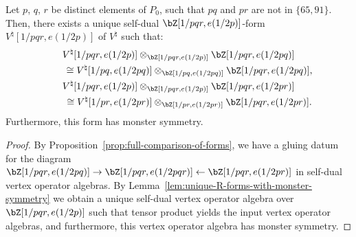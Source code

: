 \begin{lem} \label{lem:descent-for-three-primes}Let $p$, $q$, $r$ be distinct elements of $P_0$, such that $pq$ and $pr$ are not in $\{65, 91 \}$. Then, there exists a unique self-dual $\bZ[1/pqr, e(1/2p)]$-form $V^\natural[1/pqr, e(1/2p)]$ of $V^\natural$ such that:
\begin{gather*}
V^\natural[1/pqr, e(1/2p)] \otimes_{\bZ[1/pqr, e(1/2p)]} \bZ[1/pqr, e(1/2pq)] \\
\qquad{} \cong V^\natural[1/pq, e(1/2pq)] \otimes_{\bZ[1/pq, e(1/2pq)]} \bZ[1/pqr, e(1/2pq)], \\
V^\natural[1/pqr, e(1/2p)] \otimes_{\bZ[1/pqr, e(1/2p)]} \bZ[1/pqr, e(1/2pr)] \\
\qquad{} \cong V^\natural[1/pr, e(1/2pr)] \otimes_{\bZ[1/pr, e(1/2pr)]} \bZ[1/pqr, e(1/2pr)].
\end{gather*}
Furthermore, this form has monster symmetry.
\end{lem}
\begin{proof}By Proposition~\ref{prop:full-comparison-of-forms}, we have a gluing datum for the diagram $\bZ[1/pqr, e(1/2pq)] \to \bZ[1/pqr, e(1/2pqr)] \leftarrow \bZ[1/pqr, e(1/2pr)]$ in self-dual vertex operator algebras. By Lemma~\ref{lem:unique-R-forms-with-monster-symmetry} we obtain a unique self-dual vertex operator algebra over $\bZ[1/pqr,e(1/2p)]$ such that tensor product yields the input vertex operator algebras, and furthermore, this vertex operator algebra has monster symmetry.
\end{proof}

